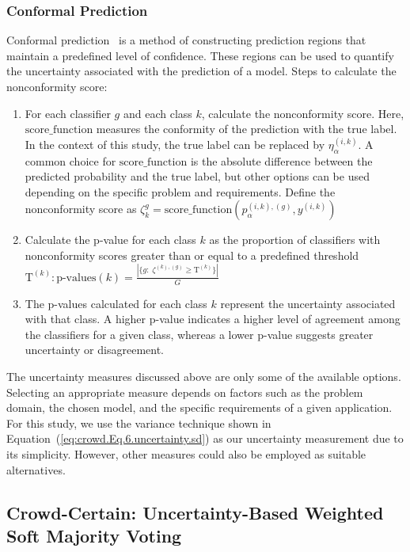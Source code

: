 \subsubsection{Conformal Prediction}
Conformal prediction~\cite{angelopoulos_Gentle_2021} is a method of constructing prediction regions that maintain a predefined level of confidence. These regions can be used to quantify the uncertainty associated with the prediction of a model.
Steps  to calculate the nonconformity score:
\begin{enumerate}
    \item For each classifier $g $ and each class $k $, calculate the nonconformity score. Here, $\mathrm{score\_function}$ measures the conformity of the prediction with the true label. In the context of this study, the true label can be replaced by $\eta_{\alpha}^{(i,k)} $. A common choice for $\mathrm{score\_function}$ is the absolute difference between the predicted probability and the true label, but other options can be used depending on the specific problem and requirements. Define the nonconformity score as $ \zeta_{k}^{g} = \mathrm{score\_function} \left(p_{\alpha}^{(i,k),(g)}, y^{(i,k)}\right) $

    \item Calculate the p-value for each class $k $ as the proportion of classifiers with nonconformity scores greater than or equal to a predefined threshold $\text{T}^{(k)}: \text{p-values}(k) = \frac{ \left\vert \{g: \;\zeta^{(k),(g)} \geq \text{T}^{(k)} \} \right\vert} {G} $

    \item The p-values calculated for each class $k $ represent the uncertainty associated with that class. A higher p-value indicates a higher level of agreement among the classifiers for a given class, whereas a lower p-value suggests greater uncertainty or disagreement.
\end{enumerate}
The uncertainty measures discussed above are only some of the available options. Selecting an appropriate measure depends on factors such as the problem domain, the chosen model, and the specific requirements of a given application. For this study, we use the variance technique shown in Equation~(\ref{eq:crowd.Eq.6.uncertainty.sd}) as our uncertainty measurement due to its simplicity. However, other measures could also be employed as suitable alternatives.

\subsection{Crowd-Certain: Uncertainty-Based Weighted Soft Majority Voting}

